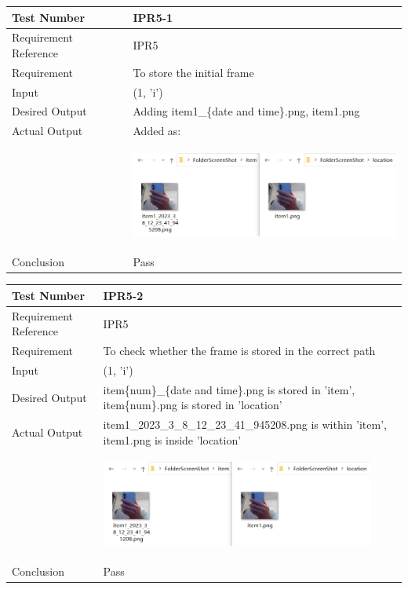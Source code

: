 \documentclass[12pt, titlepage]{article}
\begin{document}
\begin{table}[H]
\begin{center}
\begin{tabular}{|l | m{9cm}|}
\hline
  Test Number & IPR5-1\\
  \hline
  Requirement Reference & IPR5\\
  \hline
  Requirement &  To store the initial frame\\
  \hline
  Input & (1, 'i')\\
  \hline
  Desired Output & Adding item1\_\{date and time\}.png,  item1.png\\
  \hline
  Actual Output & Added as:\\&\includegraphics[width=90mm, height=35mm]{UT2.png}\\
  \hline
  Conclusion & Pass\\
  \hline
\end{tabular}
\end{center}           
\end{table}
\begin{table}[H]
\begin{center}
\begin{tabular}{|l | m{9cm}|}
\hline
  Test Number & IPR5-2\\
  \hline
  Requirement Reference & IPR5\\
  \hline
  Requirement &  To check whether the frame is stored in the correct path\\
  \hline
  Input & (1, 'i')\\
  \hline
  Desired Output &  item\{num\}\_\{date and time\}.png is stored in 'item', item\{num\}.png is stored in 'location'\\
  \hline
  Actual Output &  item1\_2023\_3\_8\_12\_23\_41\_945208.png is within 'item', item1.png is inside 'location'\\&\includegraphics[width=90mm, height=35mm]{UT2.png}\\
  \hline
  Conclusion & Pass\\
  \hline
\end{tabular}
\end{center}           
\end{table}
~\newpage
\end{document}
